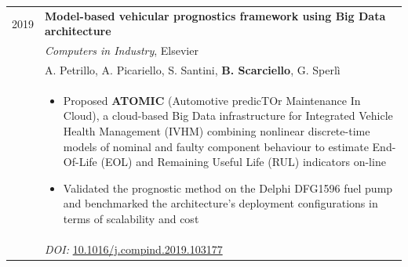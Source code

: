 
\begin{longtable}{R{2.5cm}|p{14.8cm}}

	\textsc{2019} & \textbf{Model-based vehicular prognostics framework using Big Data architecture}\\
	& \emph{Computers in Industry}, Elsevier\\
	& \footnotesize{A. Petrillo, A. Picariello, S. Santini, \textbf{B. Scarciello}, G. Sperl\`i}\\
	& \footnotesize{
		\begin{itemize}
			\item Proposed \textbf{ATOMIC} (Automotive predicTOr Maintenance In Cloud), a cloud-based Big Data infrastructure for Integrated Vehicle Health Management (IVHM) combining nonlinear discrete-time models of nominal and faulty component behaviour to estimate End-Of-Life (EOL) and Remaining Useful Life (RUL) indicators on-line
			\item Validated the prognostic method on the Delphi DFG1596 fuel pump and benchmarked the architecture's deployment configurations in terms of scalability and cost
		\end{itemize}
		\vspace{-1em}
	}\\
	& \footnotesize{\emph{DOI:} \href{https://doi.org/10.1016/j.compind.2019.103177}{10.1016/j.compind.2019.103177}}\\

\end{longtable}
